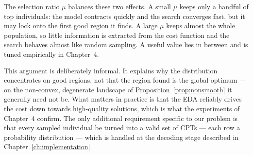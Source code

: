 The selection ratio $\mu$ balances these two effects. A small $\mu$
keeps only a handful of top individuals: the model contracts quickly
and the search converges fast, but it may lock onto the first good
region it finds. A large $\mu$ keeps almost the whole population, so
little information is extracted from the cost function and the search
behaves almost like random sampling. A useful value lies in between
and is tuned empirically in Chapter~4.

This argument is deliberately informal. It explains why the
distribution concentrates on good regions, not that the region found
is the global optimum — on the non-convex, degenerate landscape of
Proposition~\ref{prop:nonsmooth} it generally need not be. What
matters in practice is that the EDA reliably drives the cost down
towards high-quality solutions, which is what the experiments of
Chapter~4 confirm. The only additional requirement specific to our
problem is that every sampled individual be turned into a valid set of
CPTs — each row a probability distribution — which is handled at the
decoding stage described in Chapter~\ref{ch:implementation}.






